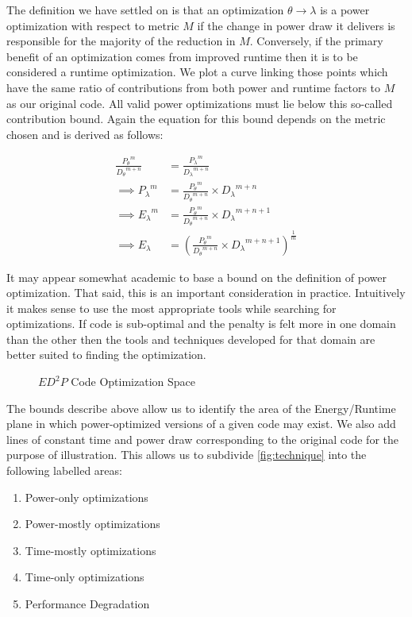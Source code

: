 The definition we have settled on is that an optimization $\theta \to \lambda$ is a power optimization with respect to metric $M$ if the change in power draw it delivers is responsible for the majority of the reduction in $M$. Conversely, if the primary benefit of an optimization comes from improved runtime then it is to be considered a runtime optimization. We plot a curve linking those points which have the same ratio of contributions from both power and runtime factors to $M$ as our original code. All valid power optimizations must lie below this so-called contribution bound. Again the equation for this bound depends on the metric chosen and is derived as follows:

\begin{align}
\frac{{P_{\theta}}^m}{{D_{\theta}}^{m+n}} &= \frac{{P_{\lambda}}^m}{{D_{\lambda}}^{m+n}} \nonumber \\
\implies {P_{\lambda}}^m &= \frac{{P_{\theta}}^m}{{D_{\theta}}^{m+n}} \times {D_\lambda}^{m+n} \nonumber \\ 
\implies {E_{\lambda}}^m &= \frac{{P_{\theta}}^m}{{D_{\theta}}^{m+n}} \times {D_\lambda}^{m+n+1} \nonumber \\ 
\implies E_{\lambda} &= (\frac{{P_{\theta}}^m}{{D_{\theta}}^{m+n}} \times {D_\lambda}^{m+n+1})^{\frac{1}{m}} 
\end{align}

It may appear somewhat academic to base a bound on the definition of power optimization. That said, this is an important consideration in practice. Intuitively it makes sense to use the most appropriate tools while searching for optimizations. If code is sub-optimal and the penalty is felt more in one domain than the other then the tools and techniques developed for that domain are better suited to finding the optimization.

\begin{figure}
\centering

\caption{$ED^2P$ Code Optimization Space}
\label{fig:technique}
\end{figure}
The bounds describe above allow us to identify the area of the Energy/Runtime plane in which power-optimized versions of a given code may exist. We also add lines of constant time and power draw corresponding to the original code for the purpose of illustration. This allows us to subdivide \autoref{fig:technique} into the following labelled areas:
\begin{enumerate}
\item Power-only optimizations
\item Power-mostly optimizations
\item Time-mostly optimizations
\item Time-only optimizations
\item Performance Degradation
\end{enumerate}

